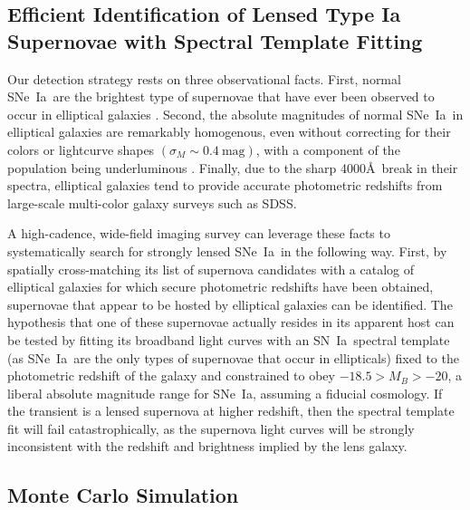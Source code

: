 \documentclass[iop,apj,numberedappendix,twocolappendix]{emulateapj}
\newcommand{\snia}{{\rm SN~Ia}}
\newcommand{\sneia}{{\rm SNe~Ia}}
\newcommand{\about}{\ensuremath{\sim}}
\begin{document}
\subsection{Efficient Identification of Lensed Type Ia Supernovae with Spectral Template Fitting}
\label{sec:propmeth}

Our detection strategy rests on three observational facts.
First, normal \sneia\ are the brightest type of supernovae that have ever been observed to occur in elliptical galaxies \citep{maozreview}.
Second, the absolute magnitudes of normal \sneia\ in elliptical galaxies are remarkably homogenous, even without correcting for their colors or lightcurve shapes $(\sigma_M \about 0.4\ \mathrm{mag})$, with a component of the population being underluminous \citep{2011MNRAS.412.1441L}.
Finally, due to the sharp 4000\AA\ break in their spectra, elliptical galaxies tend to provide accurate photometric redshifts from large-scale multi-color galaxy surveys such as SDSS.

A high-cadence, wide-field imaging survey can leverage these facts to systematically search for strongly lensed \sneia\ in the following way.
First, by spatially cross-matching its list of supernova candidates with a catalog of elliptical galaxies for which secure photometric redshifts have been obtained,  supernovae that appear to be hosted by elliptical galaxies can be identified.
The hypothesis that one of these supernovae actually resides in its apparent host can be tested by fitting its broadband light curves with an \snia\  spectral template (as \sneia\ are the only types of supernovae that occur in ellipticals) fixed to the photometric redshift of the galaxy and constrained to obey $-18.5 > M_B > -20$, a liberal absolute magnitude range for \sneia, assuming a fiducial cosmology. 
If the transient is a lensed supernova at higher redshift, then the spectral template fit will fail catastrophically, as the supernova light curves will be strongly inconsistent with the redshift and brightness implied by the lens galaxy.

\subsection{Monte Carlo Simulation}
\label{sec:detectmc}
\end{document}
